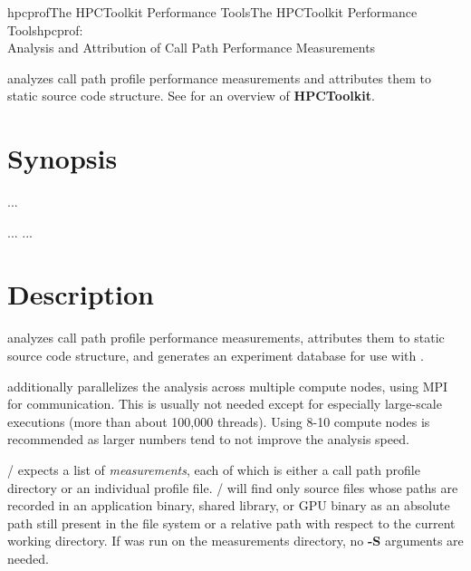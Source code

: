 \documentclass[english]{article}
\begin{document}
\begin{Name}{1}{hpcprof}{The HPCToolkit Performance Tools}{The HPCToolkit Performance Tools}{hpcprof:\\ Analysis and Attribution of Call Path Performance Measurements}

 analyzes call path profile performance measurements
and attributes them to static source code structure.
See  for an overview of \textbf{HPCToolkit}.

\end{Name}

\section{Synopsis}

  ...

...   ...

\section{Description}

 analyzes call path profile performance measurements,
attributes them to static source code structure,
and generates an experiment database for use with .

 additionally parallelizes the analysis across multiple compute
nodes, using MPI for communication.
This is usually not needed except for especially large-scale executions (more than about 100,000 threads).
Using 8-10 compute nodes is recommended as larger numbers tend to not improve the analysis speed.

/ expects a list of \emph{measurements},
each of which is either a call path profile directory or an individual profile file.
/ will find only source files whose paths are recorded in an application binary, shared library, or GPU binary
as an absolute path still present in the file system or a relative path with respect to the current working directory.
If  was run on the measurements directory, no \textbf{-S} arguments are needed.
\end{document}
